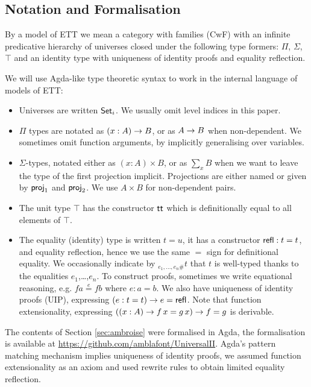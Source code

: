 \documentclass[a4paper,UKenglish,cleveref, autoref]{lipics-v2019}
\begin{document}
\subsection{Notation and Formalisation}
\label{sec:notation}

\begin{definition}\label{def:ett}
  By a model of ETT we mean a category with families (CwF)
  \cite{Dybjer96internaltype,Hofmann97syntaxand} with an infinite
  predicative hierarchy of universes closed under the following type
  formers: $\Pi$, $\Sigma$, $\top$ and an identity type with
  uniqueness of identity proofs and equality reflection.
\end{definition}

We will use Agda-like type theoretic syntax to work in the internal
language of models of ETT:
\begin{itemize}
\item Universes are written $\Set_i$. We usually omit level indices in this paper.
\item $\Pi$ types are notated as $(x : A)\ra B$, or as $A \ra B$ when
  non-dependent. We sometimes omit function arguments, by implicitly
  generalising over variables.
\item $\Sigma$-types, notated either as $(x : A)\times B$, or as
  $\sum\limits_{x} B$ when we want to leave the type of the first
  projection implicit. Projections are either named or given by
  $\proj_1$ and $\proj_2$. We use $A \times B$ for non-dependent
  pairs.
\item The unit type $\top$ has the constructor $\tt$ which is
  definitionally equal to all elements of $\top$.
\item The equality (identity) type is written $t = u$, it has a
  constructor $\refl : t = t$, and equality reflection, hence we use
  the same $=$ sign for definitional equality. We occasionally
  indicate by $_{e_1,\dots,e_n \#}t$ that $t$ is well-typed thanks to
  the equalities $e_1$,\dots,$e_n$. To construct proofs, sometimes we
  write equational reasoning, e.g. $f a \overset{e}{=} f b$ where
  $e : a = b$. We also have uniqueness of identity proofs (UIP),
  expressing $(e : t = t)\ra e = \refl$. Note that function
  extensionality, expressing $((x : A) \ra f\,x = g\,x) \ra f = g$ is
  derivable.
\end{itemize}

The contents of Section \ref{sec:ambroise} were formalised in Agda,
the formalisation is available at
\url{https://github.com/amblafont/UniversalII}. Agda's pattern
matching mechanism implies uniqueness of identity proofs, we assumed
function extensionality as an axiom and used rewrite rules
\cite{cockxsprinkles} to obtain limited equality reflection.
\end{document}
